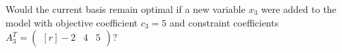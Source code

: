 Would the current basis remain optimal if a new variable $x_3$ were added to the model with objective coefficient 
$c_3 = 5$ and constraint coefficients $A_3^T = \begin{pmatrix*}[r]
  -2 & 4 & 5
\end{pmatrix*}$?

\begin{solution}
  \ \\
  \vfill
\end{solution}

